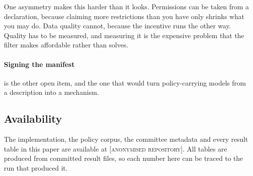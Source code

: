 \documentclass[sigconf,anonymous,review]{acmart}
\newcommand{\repourl}{\textsc{[anonymised repository]}}
\begin{document}
One asymmetry makes this harder than it looks. Permissions can be taken from a
declaration, because claiming more restrictions than you have only shrinks what
you may do. Data quality cannot, because the incentive runs the other way. Quality
has to be measured, and measuring it is the expensive problem that the filter
makes affordable rather than solves.

\paragraph{Signing the manifest} is the other open item, and the one that would
turn policy-carrying models from a description into a mechanism.

\subsection*{Availability}

The implementation, the policy corpus, the committee metadata and every result
table in this paper are available at \repourl. All tables are produced from
committed result files, so each number here can be traced to the run that produced
it.



\end{document}
